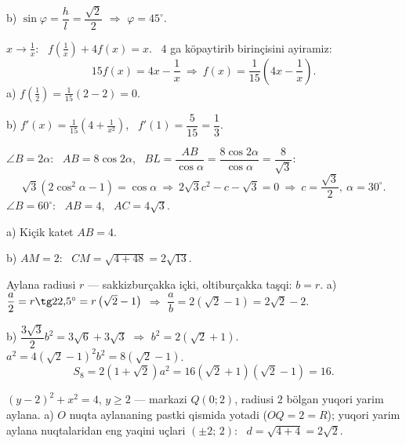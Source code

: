 b) $\sin\varphi=\dfrac hl=\dfrac{\sqrt2}2$ $\Rightarrow$ $\varphi=45^\circ$.

\newpage
{}
$x\to\frac1x$: \ $f\left(\frac1x\right)+4f(x)=x$. \ $4$ ga köpaytirib birinçisini ayiramiz:
\[15f(x)=4x-\frac1x\ \Rightarrow\ f(x)=\frac1{15}\left(4x-\frac1x\right).\]
a) $f\left(\frac12\right)=\frac1{15}(2-2)=0$.

b) $f'(x)=\frac1{15}\left(4+\frac1{x^2}\right)$, \ $f'(1)=\dfrac5{15}=\dfrac13$.

\newpage
{}
$\angle B=2\alpha$: \ $AB=8\cos2\alpha$, \ $BL=\dfrac{AB}{\cos\alpha}=\dfrac{8\cos2\alpha}{\cos\alpha}=\dfrac8{\sqrt3}$:
\[\sqrt3\left(2\cos^2\alpha-1\right)=\cos\alpha\ \Rightarrow\ 2\sqrt3c^2-c-\sqrt3=0\ \Rightarrow\ c=\frac{\sqrt3}2,\ \alpha=30^\circ.\]
$\angle B=60^\circ$: \ $AB=4$, \ $AC=4\sqrt3$.

a) Kiçik katet $AB=4$.

b) $AM=2$: \ $CM=\sqrt{4+48}=2\sqrt{13}$.

\newpage
{}
Aylana radiusi $r$ — sakkizburçakka içki, oltiburçakka taşqi: $b=r$.
a) $\dfrac a2=r\tg22{,}5^\circ=r\left(\sqrt2-1\right)$ $\Rightarrow$ $\dfrac ab=2\left(\sqrt2-1\right)=2\sqrt2-2$.

b) $\dfrac{3\sqrt3}2b^2=3\sqrt6+3\sqrt3$ $\Rightarrow$ $b^2=2\left(\sqrt2+1\right)$. \ $a^2=4\left(\sqrt2-1\right)^2b^2=8\left(\sqrt2-1\right)$.
\[S_8=2\left(1+\sqrt2\right)a^2=16\left(\sqrt2+1\right)\left(\sqrt2-1\right)=16.\]

\newpage
{}
$(y-2)^2+x^2=4$, $y\ge2$ — markazi $Q(0;2)$, radiusi $2$ bölgan yuqori yarim aylana.
a) $O$ nuqta aylananing pastki qismida yotadi ($OQ=2=R$); yuqori yarim aylana nuqtalaridan eng yaqini uçlari $(\pm2;\,2)$: \ $d=\sqrt{4+4}=2\sqrt2$.

